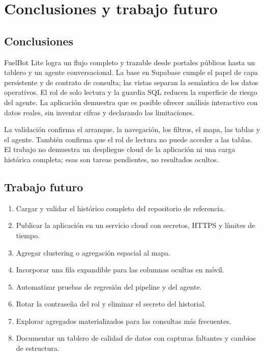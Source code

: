 \documentclass[12pt,a4paper]{article}
\begin{document}
\section{Conclusiones y trabajo futuro}

\subsection{Conclusiones}

FuelBot Lite logra un flujo completo y trazable desde portales públicos hasta un tablero y un agente conversacional. La base en Supabase cumple el papel de capa persistente y de contrato de consulta; las vistas separan la semántica de los datos operativos. El rol de solo lectura y la guardia SQL reducen la superficie de riesgo del agente. La aplicación demuestra que es posible ofrecer análisis interactivo con datos reales, sin inventar cifras y declarando las limitaciones.

La validación confirma el arranque, la navegación, los filtros, el mapa, las tablas y el agente. También confirma que el rol de lectura no puede acceder a las tablas. El trabajo no demuestra un despliegue cloud de la aplicación ni una carga histórica completa; esas son tareas pendientes, no resultados ocultos.

\subsection{Trabajo futuro}

\begin{enumerate}[leftmargin=1.2cm]
  \item Cargar y validar el histórico completo del repositorio de referencia.
  \item Publicar la aplicación en un servicio cloud con secretos, HTTPS y límites de tiempo.
  \item Agregar clustering o agregación espacial al mapa.
  \item Incorporar una fila expandible para las columnas ocultas en móvil.
  \item Automatizar pruebas de regresión del pipeline y del agente.
  \item Rotar la contraseña del rol y eliminar el secreto del historial.
  \item Explorar agregados materializados para las consultas más frecuentes.
  \item Documentar un tablero de calidad de datos con capturas faltantes y cambios de estructura.
\end{enumerate}
\end{document}
